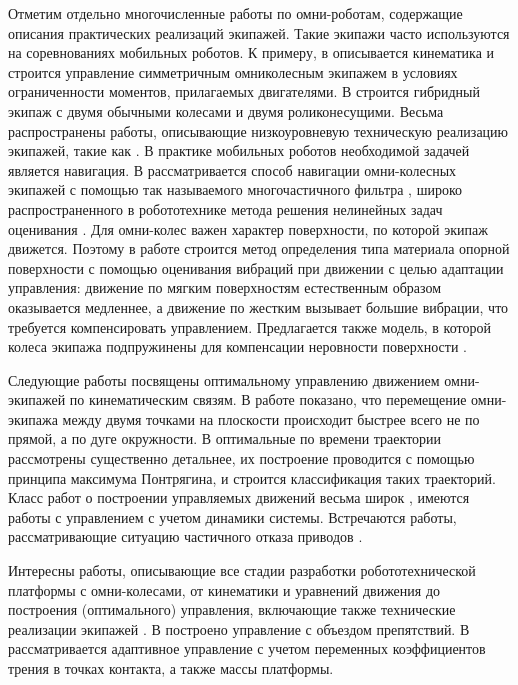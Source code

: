 Отметим отдельно многочисленные работы по омни-роботам, содержащие описания практических реализаций  экипажей. Такие экипажи часто используются на соревнованиях мобильных роботов. К примеру, в \cite{Indiveri2007} описывается кинематика и строится управление симметричным омниколесным экипажем в условиях ограниченности моментов, прилагаемых двигателями. В \cite{Wada2007} строится гибридный экипаж с двумя обычными колесами и двумя роликонесущими. Весьма распространены работы, описывающие  низкоуровневую техническую реализацию экипажей, такие как \cite{Mohamed2017,Krishnaraj2017,SalamAl-Ammri2010}. В практике мобильных роботов необходимой задачей является навигация. В \cite{Eng2010} рассматривается способ навигации омни-колесных экипажей с помощью так называемого многочастичного фильтра \cite{Gordon1993}, широко распространенного в робототехнике метода решения нелинейных задач оценивания \cite{DelMoral1997}. Для омни-колес важен характер поверхности, по которой экипаж движется. Поэтому в работе \cite{Vicente2015} строится метод определения типа материала опорной поверхности с помощью оценивания вибраций при движении с целью адаптации управления: движение по мягким поверхностям естественным образом оказывается медленнее, а движение по жестким вызывает б\textit{о}льшие вибрации, что требуется компенсировать управлением. Предлагается также модель, в которой колеса экипажа подпружинены для компенсации неровности поверхности \cite{NguenMAI2012}.

Следующие работы посвящены оптимальному управлению движением омни-экипажей
по кинематическим связям.
В работе \cite{Ashmore2002a} показано, что перемещение омни-экипажа между двумя точками на плоскости происходит быстрее всего не по прямой, а по дуге окружности. В \cite{Balkcom2006} оптимальные по времени траектории рассмотрены существенно детальнее, их построение проводится с помощью принципа максимума Понтрягина, и строится классификация таких траекторий. Класс работ о построении управляемых движений весьма широк \cite{Huang2015,Bramanta2017,Kalmar-Nagy2016,Szayer2017}, имеются работы с управлением с учетом динамики системы. Встречаются работы, рассматривающие ситуацию частичного отказа приводов \cite{Field2017,Ivanov2015a}.

Интересны работы, описывающие все стадии разработки робототехнической платформы с омни-колесами, от кинематики и уравнений движения до построения (оптимального) управления, включающие также технические реализации экипажей \cite{Williams2002,Purwin2006,Li2009}. В \cite{Galicki2009} построено управление с объездом препятствий. В \cite{Lin2013} рассматривается адаптивное управление с учетом переменных коэффициентов трения в точках контакта, а также массы платформы.

